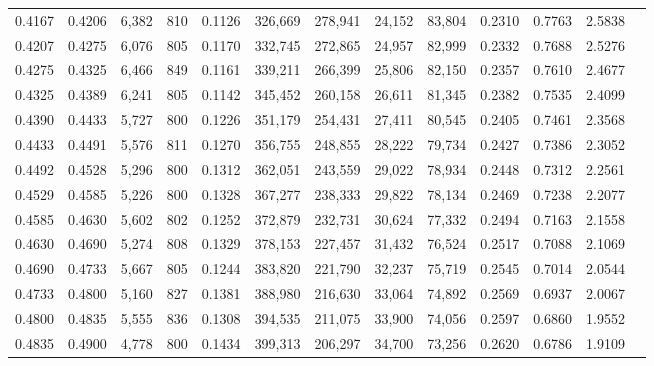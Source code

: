\begin{tabular}{rrrrrrrrrrrrr}
0.4167 & 0.4206 &  6,382 &   810 &                                     0.1126 & 326,669 & 278,941 &  24,152 &  83,804 & 0.2310 & 0.7763 & 2.5838 \\
0.4207 & 0.4275 &  6,076 &   805 &                                     0.1170 & 332,745 & 272,865 &  24,957 &  82,999 & 0.2332 & 0.7688 & 2.5276 \\
0.4275 & 0.4325 &  6,466 &   849 &                                     0.1161 & 339,211 & 266,399 &  25,806 &  82,150 & 0.2357 & 0.7610 & 2.4677 \\
0.4325 & 0.4389 &  6,241 &   805 &                                     0.1142 & 345,452 & 260,158 &  26,611 &  81,345 & 0.2382 & 0.7535 & 2.4099 \\
0.4390 & 0.4433 &  5,727 &   800 &                                     0.1226 & 351,179 & 254,431 &  27,411 &  80,545 & 0.2405 & 0.7461 & 2.3568 \\
0.4433 & 0.4491 &  5,576 &   811 &                                     0.1270 & 356,755 & 248,855 &  28,222 &  79,734 & 0.2427 & 0.7386 & 2.3052 \\
0.4492 & 0.4528 &  5,296 &   800 &                                     0.1312 & 362,051 & 243,559 &  29,022 &  78,934 & 0.2448 & 0.7312 & 2.2561 \\
0.4529 & 0.4585 &  5,226 &   800 &                                     0.1328 & 367,277 & 238,333 &  29,822 &  78,134 & 0.2469 & 0.7238 & 2.2077 \\
0.4585 & 0.4630 &  5,602 &   802 &                                     0.1252 & 372,879 & 232,731 &  30,624 &  77,332 & 0.2494 & 0.7163 & 2.1558 \\
0.4630 & 0.4690 &  5,274 &   808 &                                     0.1329 & 378,153 & 227,457 &  31,432 &  76,524 & 0.2517 & 0.7088 & 2.1069 \\
0.4690 & 0.4733 &  5,667 &   805 &                                     0.1244 & 383,820 & 221,790 &  32,237 &  75,719 & 0.2545 & 0.7014 & 2.0544 \\
0.4733 & 0.4800 &  5,160 &   827 &                                     0.1381 & 388,980 & 216,630 &  33,064 &  74,892 & 0.2569 & 0.6937 & 2.0067 \\
0.4800 & 0.4835 &  5,555 &   836 &                                     0.1308 & 394,535 & 211,075 &  33,900 &  74,056 & 0.2597 & 0.6860 & 1.9552 \\
0.4835 & 0.4900 &  4,778 &   800 &                                     0.1434 & 399,313 & 206,297 &  34,700 &  73,256 & 0.2620 & 0.6786 & 1.9109 \\

\end{tabular}
